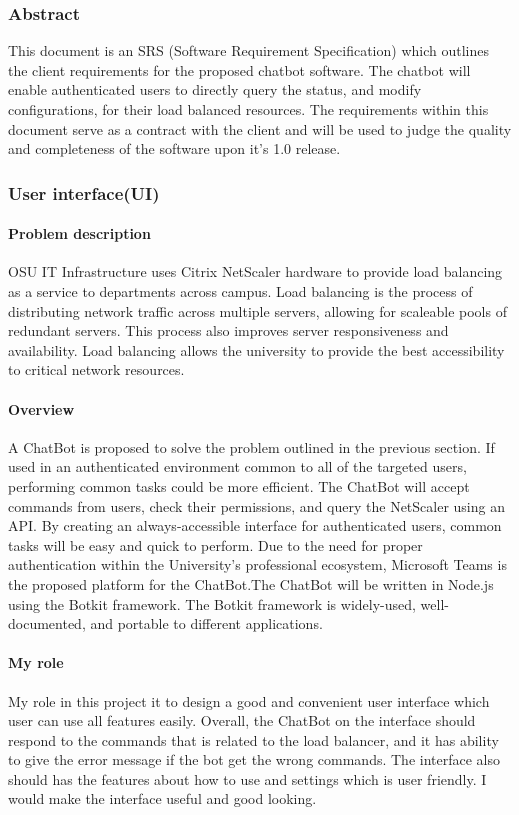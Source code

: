 \subsubsection{Abstract}

This document is an SRS (Software Requirement Specification) which outlines the client requirements for the proposed chatbot software.
The chatbot will enable authenticated users to directly query the status, and modify configurations, for their load balanced resources.
The requirements within this document serve as a contract with the client and will be used to judge the quality and completeness of the software upon it's 1.0 release.

\subsubsection{User interface(UI)}

\paragraph{Problem description}
OSU IT Infrastructure uses Citrix NetScaler hardware to provide load balancing as a service to departments across campus.
Load balancing is the process of distributing network traffic across multiple servers, allowing for scaleable pools of redundant servers.
This process also improves server responsiveness and availability.
Load balancing allows the university to provide the best accessibility to critical network resources.


\paragraph{Overview}
A ChatBot is proposed to solve the problem outlined in the previous section.
If used in an authenticated environment common to all of the targeted users, performing common tasks could be more efficient.
The ChatBot will accept commands from users, check their permissions, and query the NetScaler using an API.
By creating an always-accessible interface for authenticated users, common tasks will be easy and quick to perform.
Due to the need for proper authentication within the University's professional ecosystem, Microsoft Teams is the proposed platform for the ChatBot.The ChatBot will be written in Node.js using the Botkit framework.
The Botkit framework is widely-used, well-documented, and portable to different applications.

\paragraph{My role}
My role in this project it to design a good and convenient user interface which user can use all features easily. Overall, the ChatBot on the interface should respond to the commands that is related to the load balancer, and it has ability to give the error message if the bot get the wrong commands. The interface also should has the features about how to use and settings which is user friendly. I would make the interface useful and good looking.

